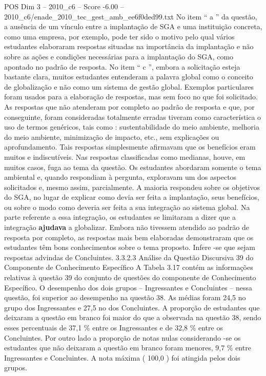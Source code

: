\begin{textsample}{POS Dim 3 – 2010\_c6 – Score -6.00 – 2010\_c6/enade\_2010\_tec\_gest\_amb\_ee6f0ded99.txt}
No item “ a ” da questão, a ausência de um vínculo entre a implantação de SGA e uma instituição concreta, como uma empresa, por exemplo, pode ter sido o motivo pelo qual vários estudantes elaboraram respostas situadas na importância da implantação e não sobre as ações e condições necessárias para a implantação do SGA, como apontado no padrão de resposta.
No item “ c ”, embora a solicitação esteja bastante clara, muitos estudantes entenderam a palavra global como o conceito de globalização e não como um sistema de gestão global.
Exemplos particulares foram usados para a elaboração de respostas, mas sem foco no que foi solicitado.
As respostas que não atenderam por completo ao padrão de resposta e que, por conseguinte, foram consideradas totalmente erradas tiveram como característica o uso de termos genéricos, tais como : sustentabilidade do meio ambiente, melhoria do meio ambiente, minimização de impacto, etc., sem explicações ou aprofundamento.
Tais respostas simplesmente afirmavam que os benefícios eram muitos e indiscutíveis.
Nas respostas classificadas como medianas, houve, em muitos casos, fuga ao tema da questão.
Os estudantes abordaram somente o tema ambiental e, quando respondiam à pergunta, exploravam um dos aspectos solicitados e, mesmo assim, parcialmente.
A maioria respondeu sobre os objetivos do SGA, no lugar de explicar como devia ser feita a implantação, seus benefícios, ou sobre o modo como deveria ser feita a sua integração ao sistema global.
Na parte referente a essa integração, os estudantes se limitaram a dizer que a integração \textbf{ajudava} a globalizar.
Embora não tivessem atendido ao padrão de resposta por completo, as respostas mais bem elaboradas demonstraram que os estudantes têm bons conhecimentos sobre o tema proposto.
Infere -se que sejam respostas advindas de Concluintes. 3.3.2.3 Análise da Questão Discursiva 39 do Componente de Conhecimento Específico A Tabela 3.17 contém as informações relativas à questão 39 do conjunto de questões do componente de Conhecimento Específico.
O desempenho dos dois grupos – Ingressantes e Concluintes – nessa questão, foi superior ao desempenho na questão 38.
As médias foram 24,5 no grupo dos Ingressantes e 27,5 no dos Concluintes.
A proporção de estudantes que deixaram a questão em branco foi maior do que a observada na questão 38, sendo esses percentuais de 37,1 \% entre os Ingressantes e de 32,8 \% entre os Concluintes.
Por outro lado a proporção de notas nulas considerando -se os estudantes que não deixaram a questão em branco foram menores, 9,7 \% entre Ingressantes e Concluintes.
A nota máxima ( 100,0 ) foi atingida pelos dois grupos.

\end{textsample}
